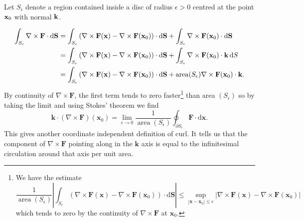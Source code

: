 \begin{example}
    Let $ S_\epsilon $ denote a region contained inside a disc of radius $ \epsilon>0 $ centred at the point ${\bf x}_0$ with normal ${\bf k}$.
    \begin{center}
    \end{center}
    \begin{align*}
        \int_{S_\epsilon} \nabla\times{\bf F} \cdot\mathrm{d}\mathbf{S} &= \int_{S_\epsilon}\left( \nabla\times{\bf F}({\bf x})-\nabla\times{\bf F}({\bf x}_0) \right)\cdot\mathrm{d}{\bf S}+\int_{S_\epsilon}\nabla\times{\bf F}({\bf x}_0)\cdot\mathrm{d}{\bf S}\\ 
        &= \int_{S_\epsilon}\left( \nabla\times{\bf F}({\bf x})-\nabla\times{\bf F}({\bf x}_0) \right)\cdot\mathrm{d}{\bf S}+\int_{S_\epsilon}\nabla\times{\bf F}({\bf x}_0)\cdot {\bf k}\,\mathrm{d} S\\ 
        &= \int_{S_\epsilon}\left( \nabla\times{\bf F}({\bf x})-\nabla\times{\bf F}({\bf x}_0) \right)\cdot\mathrm{d}{\bf S}+ \operatorname{area}(S_\epsilon) \nabla\times{\bf F}({\bf x}_0)\cdot {\bf k}.
    \end{align*}
    By continuity of $\nabla \times \mathbf{F}$, the first term tends to zero faster\footnote{We have the estimate
    \[
    \frac{1}{\operatorname{area}\left(S_{\epsilon}\right)}\left|\int_{S_{\epsilon}}\left(\nabla \times \mathbf{F}(\mathbf{x})-\nabla \times \mathbf{F}\left(\mathbf{x}_{0}\right)\right) \cdot \mathrm{d} \mathbf{S}\right| \leq \sup _{\left|\mathbf{x}-\mathbf{x}_{0}\right| \leq \epsilon}\left|\nabla \times \mathbf{F}(\mathbf{x})-\nabla \times \mathbf{F}\left(\mathbf{x}_{0}\right)\right|
    \]
    which tends to zero by the continuity of $\nabla \times \mathbf{F}$ at $\mathbf{x}_{0}$.} than area $\left(S_{\epsilon}\right)$ so by taking
    the limit and using Stokes' theorem we find
    \[
    \mathbf{k} \cdot(\nabla \times \mathbf{F})\left(\mathbf{x}_{0}\right)=\lim _{\epsilon \rightarrow 0} \frac{1}{\operatorname{area}\left(S_{\epsilon}\right)} \oint_{\partial S_{\epsilon}} \mathbf{F} \cdot \mathrm{d} \mathbf{x}.
    \]
    This gives another coordinate independent definition of curl. It tells us that the component of $\nabla \times \mathbf{F}$ pointing along in the $\mathbf{k}$ axis is equal to the infinitesimal circulation around that axis per unit area.
\end{example}
